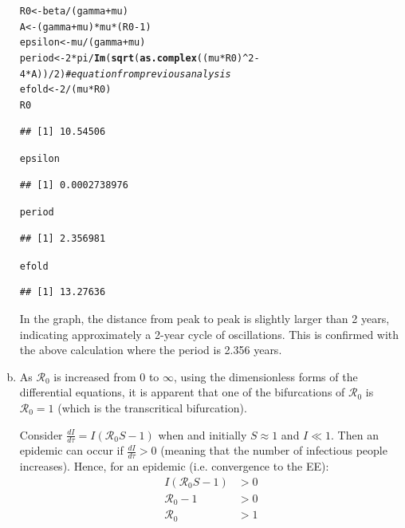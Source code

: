\documentclass[12pt]{article}\usepackage[]{graphicx}\usepackage[]{color}
\makeatletter
\newcommand{\hlnum}[1]{\textcolor[rgb]{0.686,0.059,0.569}{#1}}%
\newcommand{\hlcom}[1]{\textcolor[rgb]{0.678,0.584,0.686}{\textit{#1}}}%
\newcommand{\hlopt}[1]{\textcolor[rgb]{0,0,0}{#1}}%
\newcommand{\hlstd}[1]{\textcolor[rgb]{0.345,0.345,0.345}{#1}}%
\newcommand{\hlkwb}[1]{\textcolor[rgb]{0.69,0.353,0.396}{#1}}%
\newcommand{\hlkwd}[1]{\textcolor[rgb]{0.737,0.353,0.396}{\textbf{#1}}}%
\newenvironment{kframe}{%
 \def\at@end@of@kframe{}%
 \ifinner\ifhmode%
  \def\at@end@of@kframe{\end{minipage}}%
  \begin{minipage}{\columnwidth}%
 \fi\fi%
 \def\FrameCommand##1{\hskip\@totalleftmargin \hskip-\fboxsep
 \colorbox{shadecolor}{##1}\hskip-\fboxsep
     \hskip-\linewidth \hskip-\@totalleftmargin \hskip\columnwidth}%
 \MakeFramed {\advance\hsize-\width
   \@totalleftmargin\z@ \linewidth\hsize
   \@setminipage}}%
 {\par\unskip\endMakeFramed%
 \at@end@of@kframe}
\newenvironment{knitrout}{}{} %
\makeatother
\begin{document}
\begin{enumerate}[(a)]
\begin{knitrout}
\begin{kframe}
\begin{alltt}
\hlstd{R0} \hlkwb{<-} \hlstd{beta}\hlopt{/}\hlstd{(gamma}\hlopt{+}\hlstd{mu)}
\hlstd{A} \hlkwb{<-} \hlstd{(gamma}\hlopt{+}\hlstd{mu)}\hlopt{*}\hlstd{mu}\hlopt{*}\hlstd{(R0}\hlopt{-}\hlnum{1}\hlstd{)}
\hlstd{epsilon} \hlkwb{<-} \hlstd{mu}\hlopt{/}\hlstd{(gamma}\hlopt{+}\hlstd{mu)}
\hlstd{period} \hlkwb{<-} \hlnum{2}\hlopt{*}\hlstd{pi}\hlopt{/}\hlkwd{Im}\hlstd{(}\hlkwd{sqrt}\hlstd{(}\hlkwd{as.complex}\hlstd{((mu}\hlopt{*}\hlstd{R0)}\hlopt{^}\hlnum{2}\hlopt{-}\hlnum{4}\hlopt{*}\hlstd{A))}\hlopt{/}\hlnum{2}\hlstd{)} \hlcom{#equation from previous analysis}
\hlstd{efold} \hlkwb{<-} \hlnum{2}\hlopt{/}\hlstd{(mu}\hlopt{*}\hlstd{R0)}
\hlstd{R0}
\end{alltt}
\begin{verbatim}
## [1] 10.54506
\end{verbatim}
\begin{alltt}
\hlstd{epsilon}
\end{alltt}
\begin{verbatim}
## [1] 0.0002738976
\end{verbatim}
\begin{alltt}
\hlstd{period}
\end{alltt}
\begin{verbatim}
## [1] 2.356981
\end{verbatim}
\begin{alltt}
\hlstd{efold}
\end{alltt}
\begin{verbatim}
## [1] 13.27636
\end{verbatim}
\end{kframe}
\end{knitrout}

In the graph, the distance from peak to peak is slightly larger than 2 years, indicating approximately a 2-year cycle of oscillations. This is confirmed with the above calculation where the period is 2.356 years.
\item

As $\mathcal R_0$ is increased from 0 to $\infty$, using the dimensionless forms of the differential equations, it is apparent that one of the bifurcations of $\mathcal R_0$ is $\mathcal R_0 = 1$ (which is the transcritical bifurcation).

Consider $\frac{dI}{d\tau} = I(\mathcal R_0 S - 1)$ when and initially $S\approx 1$ and $I \ll 1$. Then an epidemic can occur if $\frac{dI}{d\tau} > 0$ (meaning that the number of infectious people increases).
Hence, for an epidemic (i.e. convergence to the EE):
\begin{align*}
  I(\mathcal R_0 S - 1) &> 0\\
  \mathcal R_0 - 1 &> 0\\
  \mathcal R_0 &> 1
\end{align*}


\end{enumerate}
\end{document}
